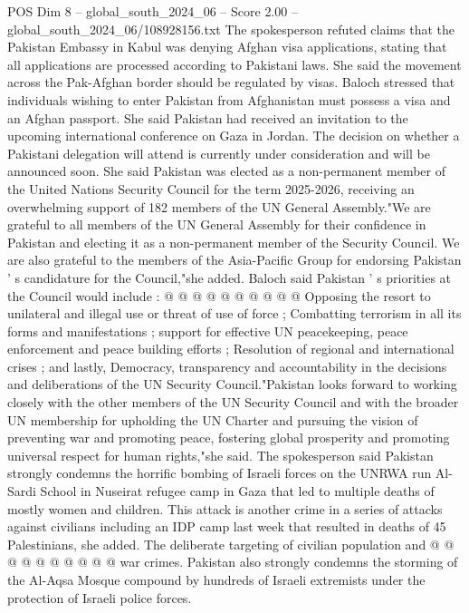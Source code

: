 \begin{textsample}{POS Dim 8 – global\_south\_2024\_06 – Score 2.00 – global\_south\_2024\_06/108928156.txt}  \label{ex:f8_pos_410}
The spokesperson refuted claims that the Pakistan Embassy in Kabul was denying Afghan visa applications, stating that all applications are processed according to Pakistani laws.
She said the movement across the Pak-Afghan border should be regulated by visas.
Baloch stressed that individuals wishing to enter Pakistan from Afghanistan must possess a visa and an Afghan passport.
She said Pakistan had received an invitation to the upcoming international conference on Gaza in Jordan.
The decision on whether a Pakistani delegation will attend is currently under consideration and will be announced soon.
She said Pakistan was elected as a non-permanent member of the United Nations Security Council for the term 2025-2026, receiving an overwhelming support of 182 members of the UN General Assembly."We are grateful to all members of the UN General Assembly for their confidence in Pakistan and electing it as a non-permanent member of the Security Council.
We are also grateful to the members of the Asia-Pacific Group for endorsing Pakistan ' s candidature for the Council,"she added.
Baloch said Pakistan ' s priorities at the Council would include : @ @ @ @ @ @ @ @ @ @ Opposing the resort to unilateral and illegal use or threat of use of force ; Combatting terrorism in all its forms and manifestations ; support for effective UN peacekeeping, peace enforcement and peace building efforts ; Resolution of regional and international crises ; and lastly, Democracy, transparency and accountability in the decisions and deliberations of the UN Security Council."Pakistan looks forward to working closely with the other members of the UN Security Council and with the broader UN membership for upholding the UN Charter and pursuing the vision of preventing war and promoting peace, fostering global prosperity and promoting universal respect for human rights,"she said.
The spokesperson said Pakistan strongly condemns the horrific bombing of Israeli forces on the UNRWA run Al-Sardi School in Nuseirat refugee camp in Gaza that led to multiple deaths of mostly women and children.
This attack is another crime in a series of attacks against civilians including an IDP camp last week that resulted in deaths of 45 Palestinians, she added.
The deliberate targeting of civilian population and @ @ @ @ @ @ @ @ @ @ war crimes.
Pakistan also strongly condemns the storming of the Al-Aqsa Mosque compound by hundreds of Israeli extremists under the protection of Israeli police forces.

\end{textsample}

